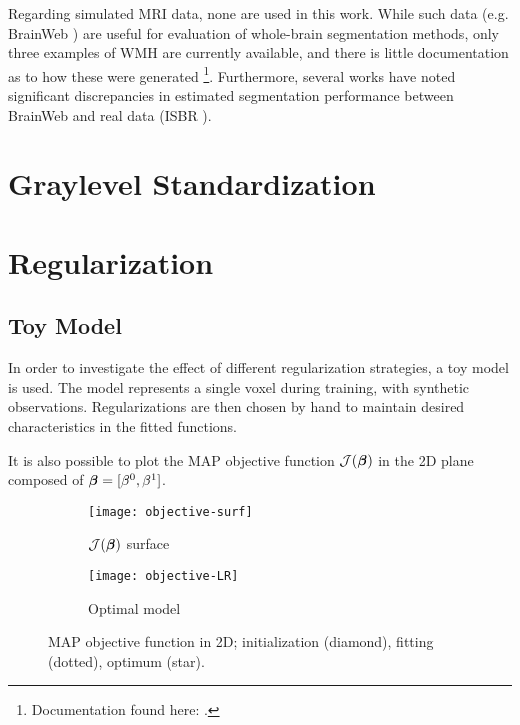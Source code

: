 Regarding simulated MRI data, none are used in this work.
While such data (e.g. BrainWeb \cite{Collins1998}) are useful for evaluation of whole-brain segmentation methods, only three examples of WMH are currently available, and there is little documentation as to how these were generated%
\footnote{Documentation found here: .}.
Furthermore, several works \cite{Klauschen2009,Eggert2012} have noted significant discrepancies in estimated segmentation performance between BrainWeb and real data (ISBR \cite{IBSR}).
\section{Graylevel Standardization}



\section{Regularization}


\subsection{Toy Model}\label{ss:toyreg}
In order to investigate the effect of different regularization strategies, a toy model is used.
The model represents a single voxel during training, with synthetic observations.
Regularizations are then chosen by hand to maintain desired characteristics in the fitted functions.
\par
It is also possible to plot the MAP objective function $\mathcal{J}(\bm{\beta})$ in the 2D plane composed of $\bm{\beta} = [\beta^0,\beta^1]$.
\begin{figure}
  \centering
  \begin{subfigure}{\plotwidth}\centering\texttt{[image: objective-surf]}\caption{$\mathcal{J}(\bm{\beta})$ surface}\label{fig:obj-surf}\end{subfigure}
  \begin{subfigure}{\plotwidth}\centering\texttt{[image: objective-LR]}  \caption{Optimal model}\label{fig:obj-lr}\end{subfigure}
  \caption{MAP objective function in 2D; initialization (diamond), fitting (dotted), optimum (star).}
\end{figure}


